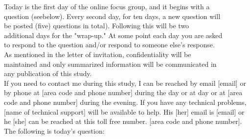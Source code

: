 \documentclass[a4,9pt]{beamer}
\begin{document}
\begin{frame}
\hspace*{0.7cm} Today is the first day of the online focus group, and it begins with a \\
\hspace*{0.7cm} question (seebelow). Every second day, for ten days, a new question will \\
\hspace*{0.7cm} be posted (five) questions in total). Following this will be two  \\
\hspace*{0.7cm} additional days for the "wrap-up." At some point each day you are asked\\ 
\hspace*{0.7cm} to respond to the question and/or respond to someone else's response.\\
\hspace*{0.7cm} As mentioned in the letter of invitation, confidentiality will be \\
\hspace*{0.7cm} maintained and only summarized information will be communicated in\\
\hspace*{0.7cm} any publication of this study.\\

\vspace*{0.2cm}
If you need to contact me during this study, I can be reached by email [email] or by phone at [area code and phone number] during the day or at day or at [area code and phone number] during the evening. If you have any technical problems, [name of technical support] will be available to help. His [her] email is [email] or he [she] can be reached at this toll free number. [area code and phone number].\\

\vspace*{0.2cm}
The following is today's question:\\
\end{frame}
\end{document}
